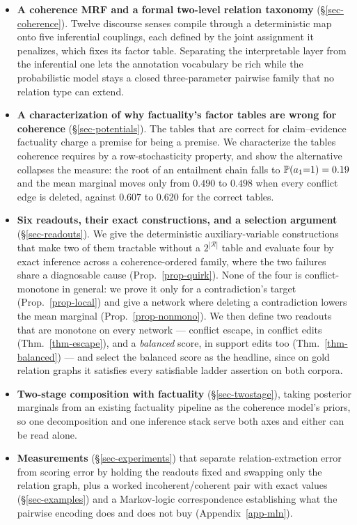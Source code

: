 \begin{itemize}[leftmargin=1.4em,itemsep=2pt,topsep=3pt]
\item \textbf{A coherence MRF and a formal two-level relation taxonomy}
  (\S\ref{sec-coherence}). Twelve discourse senses compile through a deterministic map onto five
  inferential couplings, each defined by the joint assignment it penalizes, which fixes its factor
  table. Separating the interpretable layer from the inferential one lets the annotation
  vocabulary be rich while the probabilistic model stays a closed three-parameter pairwise family
  that no relation type can extend.
\item \textbf{A characterization of why factuality's factor tables are wrong for coherence}
  (\S\ref{sec-potentials}). The tables that are correct for claim--evidence factuality charge a
  premise for being a premise. We characterize the tables coherence requires by a
  row-stochasticity property, and show the alternative collapses the measure: the root of an
  entailment chain falls to $\mathbb{P}\!\left( a_1{=}1 \right)=0.19$ and the mean marginal moves only from $0.490$ to
  $0.498$ when every conflict edge is deleted, against $0.607$ to $0.620$ for the correct tables.
\item \textbf{Six readouts, their exact constructions, and a selection argument}
  (\S\ref{sec-readouts}). We give the deterministic auxiliary-variable constructions that make two
  of them tractable without a $2^{|\mathcal{R}|}$ table and evaluate four by exact inference across a
  coherence-ordered family, where the two failures share a diagnosable cause (Prop.~\ref{prop-quirk}).
  None of the four is conflict-monotone in general: we prove it only for a contradiction's target
  (Prop.~\ref{prop-local}) and give a network where deleting a contradiction lowers the mean marginal
  (Prop.~\ref{prop-nonmono}). We then define two readouts that are monotone on every network ---
  conflict escape, in conflict edits (Thm.~\ref{thm-escape}), and a \emph{balanced} score, in support
  edits too (Thm.~\ref{thm-balanced}) --- and select the balanced score as the headline, since on gold
  relation graphs it satisfies every satisfiable ladder assertion on both corpora.
\item \textbf{Two-stage composition with factuality} (\S\ref{sec-twostage}), taking posterior
  marginals from an existing factuality pipeline as the coherence model's priors, so one
  decomposition and one inference stack serve both axes and either can be read alone.
\item \textbf{Measurements} (\S\ref{sec-experiments}) that separate relation-extraction error from
  scoring error by holding the readouts fixed and swapping only the relation graph, plus a worked
  incoherent/coherent pair with exact values (\S\ref{sec-examples}) and a Markov-logic
  correspondence establishing what the pairwise encoding does and does not buy
  (Appendix~\ref{app-mln}).
\end{itemize}

